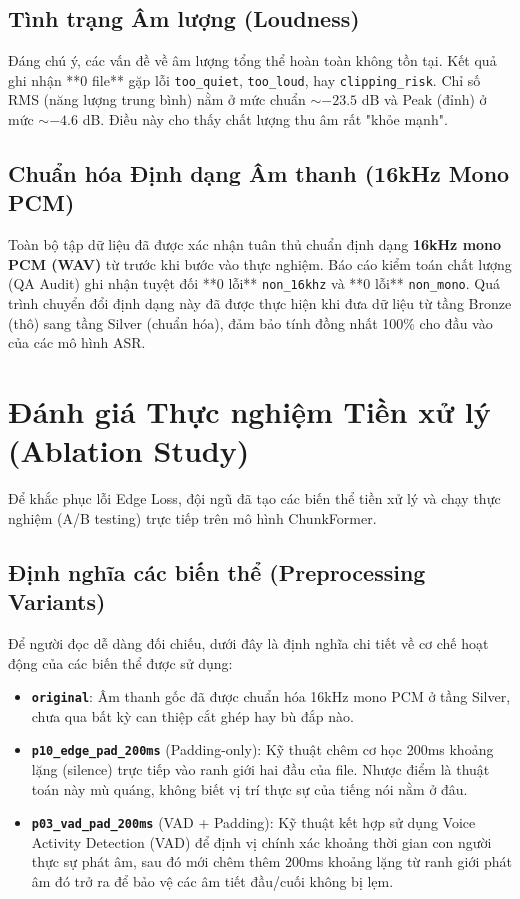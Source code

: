 \documentclass[12pt,a4paper]{article}
\begin{document}
\subsection{Tình trạng Âm lượng (Loudness)}
Đáng chú ý, các vấn đề về âm lượng tổng thể hoàn toàn không tồn tại. Kết quả ghi nhận **0 file** gặp lỗi \texttt{too\_quiet}, \texttt{too\_loud}, hay \texttt{clipping\_risk}.
Chỉ số RMS (năng lượng trung bình) nằm ở mức chuẩn $\sim -23.5$ dB và Peak (đỉnh) ở mức $\sim -4.6$ dB. Điều này cho thấy chất lượng thu âm rất "khỏe mạnh".

\subsection{Chuẩn hóa Định dạng Âm thanh (16kHz Mono PCM)}
Toàn bộ tập dữ liệu đã được xác nhận tuân thủ chuẩn định dạng \textbf{16kHz mono PCM (WAV)} từ trước khi bước vào thực nghiệm. Báo cáo kiểm toán chất lượng (QA Audit) ghi nhận tuyệt đối **0 lỗi** \texttt{non\_16khz} và **0 lỗi** \texttt{non\_mono}. Quá trình chuyển đổi định dạng này đã được thực hiện khi đưa dữ liệu từ tầng Bronze (thô) sang tầng Silver (chuẩn hóa), đảm bảo tính đồng nhất 100\% cho đầu vào của các mô hình ASR.

\section{Đánh giá Thực nghiệm Tiền xử lý (Ablation Study)}

Để khắc phục lỗi Edge Loss, đội ngũ đã tạo các biến thể tiền xử lý và chạy thực nghiệm (A/B testing) trực tiếp trên mô hình ChunkFormer.

\subsection{Định nghĩa các biến thể (Preprocessing Variants)}
Để người đọc dễ dàng đối chiếu, dưới đây là định nghĩa chi tiết về cơ chế hoạt động của các biến thể được sử dụng:
\begin{itemize}[leftmargin=1.2cm]
    \item \textbf{\texttt{original}}: Âm thanh gốc đã được chuẩn hóa 16kHz mono PCM ở tầng Silver, chưa qua bất kỳ can thiệp cắt ghép hay bù đắp nào.
    \item \textbf{\texttt{p10\_edge\_pad\_200ms}} (Padding-only): Kỹ thuật chêm cơ học 200ms khoảng lặng (silence) trực tiếp vào ranh giới hai đầu của file. Nhược điểm là thuật toán này mù quáng, không biết vị trí thực sự của tiếng nói nằm ở đâu.
    \item \textbf{\texttt{p03\_vad\_pad\_200ms}} (VAD + Padding): Kỹ thuật kết hợp sử dụng Voice Activity Detection (VAD) để định vị chính xác khoảng thời gian con người thực sự phát âm, sau đó mới chêm thêm 200ms khoảng lặng từ ranh giới phát âm đó trở ra để bảo vệ các âm tiết đầu/cuối không bị lẹm.
\end{itemize}
\end{document}

